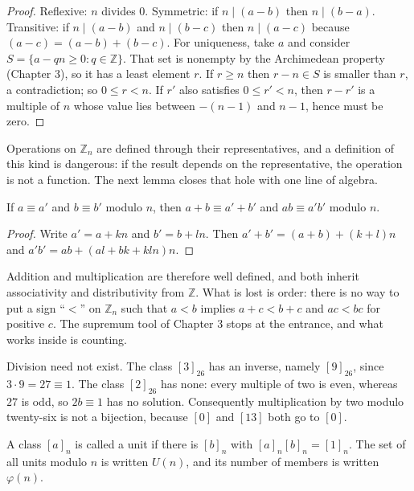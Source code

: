 \begin{proof}
Reflexive: $n$ divides $0$. Symmetric: if $n\mid(a-b)$ then $n\mid(b-a)$. Transitive: if
$n\mid(a-b)$ and $n\mid(b-c)$ then $n\mid(a-c)$ because $(a-c)=(a-b)+(b-c)$. For uniqueness, take
$a$ and consider $S=\{a-qn\ge0: q\in\mathbb{Z}\}$. That set is nonempty by the Archimedean property
(Chapter 3), so it has a least element $r$. If $r\ge n$ then $r-n\in S$ is smaller than $r$, a
contradiction; so $0\le r<n$. If $r'$ also satisfies $0\le r'<n$, then $r-r'$ is a multiple of $n$
whose value lies between $-(n-1)$ and $n-1$, hence must be zero.
\end{proof}

Operations on $\mathbb{Z}_n$ are defined through their representatives, and a definition of this
kind is dangerous: if the result depends on the representative, the operation is not a function. The
next lemma closes that hole with one line of algebra.

\begin{lemma}
If $a\equiv a'$ and $b\equiv b'$ modulo $n$, then $a+b\equiv a'+b'$ and $ab\equiv a'b'$ modulo $n$.
\end{lemma}

\begin{proof}
Write $a'=a+kn$ and $b'=b+ln$. Then $a'+b'=(a+b)+(k+l)n$ and $a'b'=ab+(al+bk+kln)n$.
\end{proof}

Addition and multiplication are therefore well defined, and both inherit associativity and
distributivity from $\mathbb{Z}$. What is lost is order: there is no way to put a sign ``$<$'' on
$\mathbb{Z}_n$ such that $a<b$ implies $a+c<b+c$ and $ac<bc$ for positive $c$. The supremum tool of
Chapter 3 stops at the entrance, and what works inside is counting.

Division need not exist. The class $[3]_{26}$ has an inverse, namely $[9]_{26}$, since
$3\cdot9=27\equiv1$. The class $[2]_{26}$ has none: every multiple of two is even, whereas $27$ is
odd, so $2b\equiv1$ has no solution. Consequently multiplication by two modulo twenty-six is not a
bijection, because $[0]$ and $[13]$ both go to $[0]$.


\begin{definisi}
A class $[a]_n$ is called a unit if there is $[b]_n$ with $[a]_n[b]_n=[1]_n$. The set of all units
modulo $n$ is written $U(n)$, and its number of members is written $\varphi(n)$.
\end{definisi}

